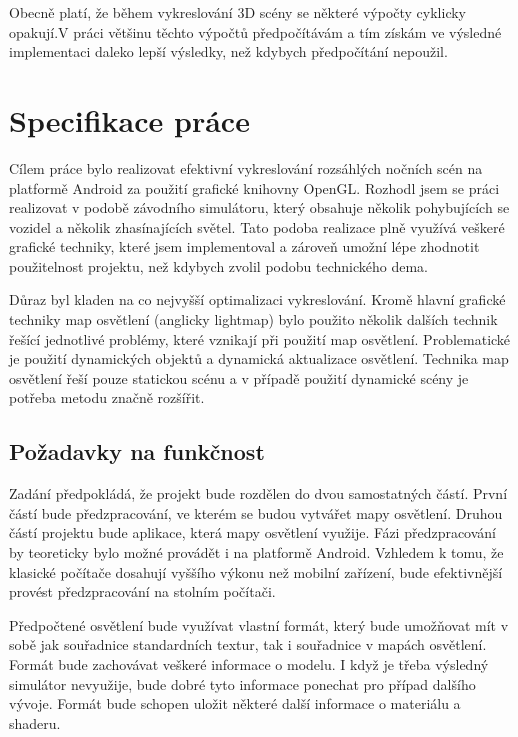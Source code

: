 \documentclass[11pt,twoside,a4paper]{book}
\begin{document}
Obecně platí, že během vykreslování 3D scény se některé výpočty cyklicky opakují.\linebreak V práci většinu těchto výpočtů předpočítávám a tím získám ve výsledné implementaci daleko lepší výsledky, než kdybych předpočítání nepoužil.

\chapter{Specifikace práce}
Cílem práce bylo realizovat efektivní vykreslování rozsáhlých nočních scén na platformě Android za použití grafické knihovny OpenGL. Rozhodl jsem se práci realizovat v podobě závodního simulátoru, který obsahuje několik pohybujících se vozidel a několik zhasínajících světel. Tato podoba realizace plně využívá veškeré grafické techniky, které jsem implementoval a zároveň umožní lépe zhodnotit použitelnost projektu, než kdybych zvolil podobu technického dema.

Důraz byl kladen na co nejvyšší optimalizaci vykreslování. Kromě hlavní grafické techniky map osvětlení (anglicky lightmap) bylo použito několik dalších technik řešící jednotlivé problémy, které vznikají při použití map osvětlení. Problematické je použití dynamických objektů a dynamická aktualizace osvětlení. Technika map osvětlení řeší pouze statickou scénu a v případě použití dynamické scény je potřeba metodu značně rozšířit.

\section{Požadavky na funkčnost}
Zadání předpokládá, že projekt bude rozdělen do dvou samostatných částí. První částí bude předzpracování, ve kterém se budou vytvářet mapy osvětlení. Druhou částí projektu bude aplikace, která mapy osvětlení využije. Fázi předzpracování by teoreticky bylo možné provádět i na platformě Android. Vzhledem k tomu, že klasické počítače dosahují vyššího výkonu než mobilní zařízení, bude efektivnější provést předzpracování na stolním počítači.

Předpočtené osvětlení bude využívat vlastní formát, který bude umožňovat mít v sobě jak souřadnice standardních textur, tak i souřadnice v mapách osvětlení. Formát bude zachovávat veškeré informace o modelu. I když je třeba výsledný simulátor nevyužije, bude dobré tyto informace ponechat pro případ dalšího vývoje. Formát bude schopen uložit některé další informace o materiálu a shaderu.
\end{document}
